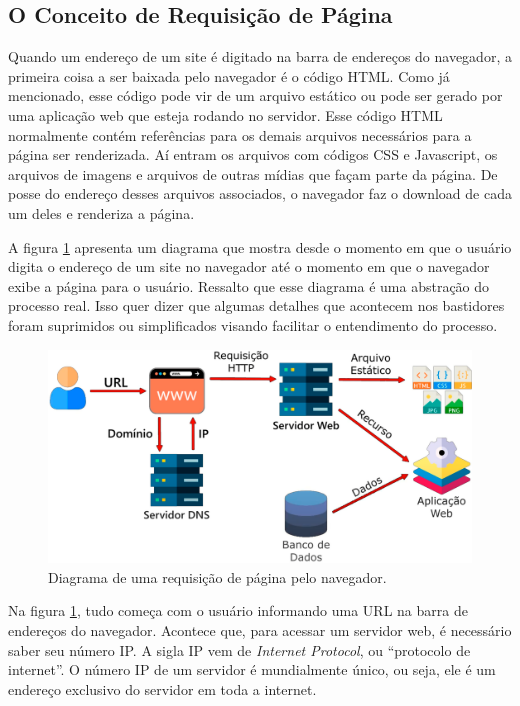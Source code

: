 \subsection{O Conceito de Requisição de Página}

Quando um endereço de um site é digitado na barra de endereços do navegador, a primeira coisa a ser baixada pelo navegador é o código HTML. Como já mencionado, esse código pode vir de um arquivo estático ou pode ser gerado por uma aplicação web que esteja rodando no servidor. Esse código HTML normalmente contém referências para os demais arquivos necessários para a página ser renderizada. Aí entram os arquivos com códigos CSS e Javascript, os arquivos de imagens e arquivos de outras mídias que façam parte da página. De posse do endereço desses arquivos associados, o navegador faz o download de cada um deles e renderiza a página.

A figura \ref{fig:reqpagina} apresenta um diagrama que mostra desde o momento em que o usuário digita o endereço de um site no navegador até o momento em que o navegador exibe a página para o usuário. Ressalto que esse diagrama é uma abstração do processo real. Isso quer dizer que algumas detalhes que acontecem nos bastidores foram suprimidos ou simplificados visando facilitar o entendimento do processo.

\begin{figure}[htbp!]
    \centering
    \includegraphics[width=1\textwidth]{Images/chapter01/digrama_requisicao.png}
    \caption{Diagrama de uma requisição de página pelo navegador.}
    \label{fig:reqpagina}
\end{figure}

Na figura \ref{fig:reqpagina}, tudo começa com o usuário informando uma URL na barra de endereços do navegador. Acontece que, para acessar um servidor web, é necessário saber seu número IP. A sigla IP vem de \textit{Internet Protocol}, ou ``protocolo de internet''. O número IP de um servidor é mundialmente único, ou seja, ele é um endereço exclusivo do servidor em toda a internet.

